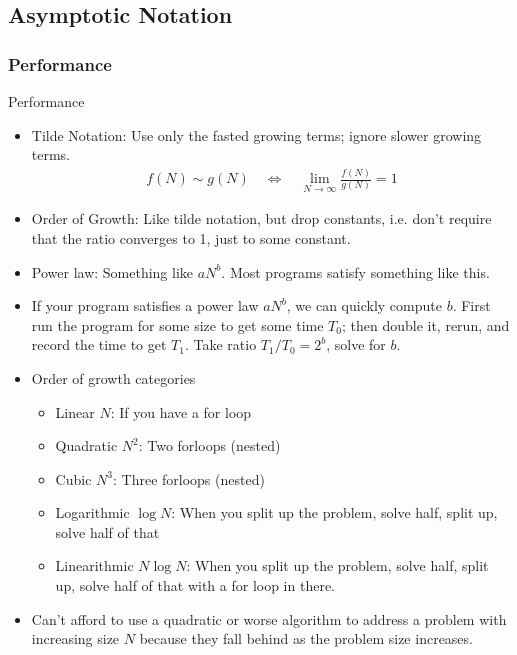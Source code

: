 \documentclass[12pt]{article}
\theoremstyle{plain}
\theoremstyle{definition}
\theoremstyle{remark}
\newcommand{\limN}{\lim_{N\rightarrow\infty}}
\begin{document}
\clearpage
\subsection{Asymptotic Notation}

\subsubsection{Performance}

Performance
\begin{itemize}
  \item
    Tilde Notation:
    Use only the fasted growing terms; ignore slower growing terms.
    \begin{align*}
      f(N)\sim g(N)
      \quad\iff\quad
      \limN
      \frac{f(N)}{g(N)}
      = 1
    \end{align*}

  \item
    Order of Growth:
    Like tilde notation, but drop constants, i.e. don't require that the
    ratio converges to 1, just to some constant.

  \item Power law:
    Something like $aN^b$.
    Most programs satisfy something like this.

  \item
    If your program satisfies a power law $aN^b$, we can quickly compute
    $b$.
    First run the program for some size to get some time $T_0$; then
    double it, rerun, and record the time to get $T_1$.
    Take ratio $T_1/T_0 =2^b$, solve for $b$.

  \item
    Order of growth categories
    \begin{itemize}
      \item Linear $N$: If you have a for loop
      \item Quadratic $N^2$: Two forloops (nested)
      \item Cubic $N^3$: Three forloops (nested)
      \item Logarithmic $\log N$: When you split up the problem, solve
        half, split up, solve half of that
      \item Linearithmic $N\log N$: When you split up the problem, solve
        half, split up, solve half of that with a for loop in there.
    \end{itemize}

  \item
    Can't afford to use a quadratic or worse algorithm to address a
    problem with increasing size $N$ because they fall behind as the
    problem size increases.
\end{itemize}
\end{document}
